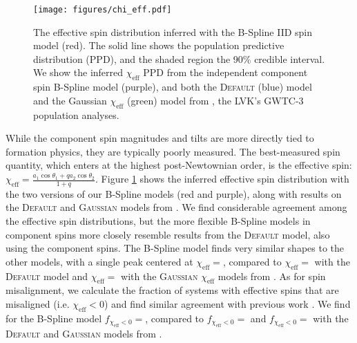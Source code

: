 \begin{figure} 
    \begin{centering}
        \texttt{[image: figures/chi\_eff.pdf]}
        \caption{The effective spin distribution inferred with the B-Spline IID spin model (red). The solid line shows the population predictive distribution (PPD), and the shaded region the 90\% credible interval. We show the inferred $\chi_\mathrm{eff}$ 
        PPD from the independent component spin B-Spline model (purple), and both the \textsc{Default} (blue) model and the 
        Gaussian $\chi_\mathrm{eff}$ (green) model from \citet{o3b_astro_dist}, the LVK's GWTC-3 population analyses.}
        \label{fig:chieff_dist}
    \end{centering}
\end{figure}

While the component spin magnitudes and tilts are more directly tied to formation physics, they are typically poorly measured.  The best-measured spin quantity, which enters at the highest post-Newtownian order, is the effective spin: $\chi_\mathrm{eff} = \frac{a_1\cos{\theta_1} + qa_2\cos{\theta_2}}{1+q}$. Figure \ref{fig:chieff_dist} 
shows the inferred effective spin distribution with the two versions of our B-Spline models (red and purple), 
along with results on the \textsc{Default} \citep{Talbot_2017} and \textsc{Gaussian} \citep{Miller2020} models from \citet{o3b_astro_dist}. We find considerable agreement 
among the effective spin distributions, but the more flexible B-Spline models in component spins more closely resemble results from the \textsc{Default} model, also using the component spins. The B-Spline model finds very similar shapes to the other models, with a single peak centered at 
$\chi_\mathrm{eff}=$\result{$\CIPlusMinus{\macros[ChiEffective][iid][PeakChiEff]}$}, compared to 
$\chi_\mathrm{eff}=$\result{$\CIPlusMinus{\macros[ChiEffective][default][PeakChiEff]}$} with the \textsc{Default} model and 
$\chi_\mathrm{eff}=$\result{$\CIPlusMinus{\macros[ChiEffective][gaussian][PeakChiEff]}$} with the \textsc{Gaussian} $\chi_\mathrm{eff}$ models from \citet{o3b_astro_dist}. 
As for spin misalignment, we calculate the fraction of systems with effective spins that are misaligned (i.e. $\chi_\mathrm{eff}<0$) and find similar 
agreement with previous work \citep{o3a_pop,o3b_astro_dist,Callister_NoEvidence}. We find for the B-Spline model 
$f_{\chi_\mathrm{eff}<0}=$\result{$\CIPlusMinus{\macros[ChiEffective][iid][FracBelow0]}$}, compared to 
$f_{\chi_\mathrm{eff}<0}=$\result{$\CIPlusMinus{\macros[ChiEffective][default][FracBelow0]}$} and $f_{\chi_\mathrm{eff}<0}=$\result{$\CIPlusMinus{\macros[ChiEffective][gaussian][FracBelow0]}$} 
with the \textsc{Default} and \textsc{Gaussian} models from \citet{o3b_astro_dist}.

